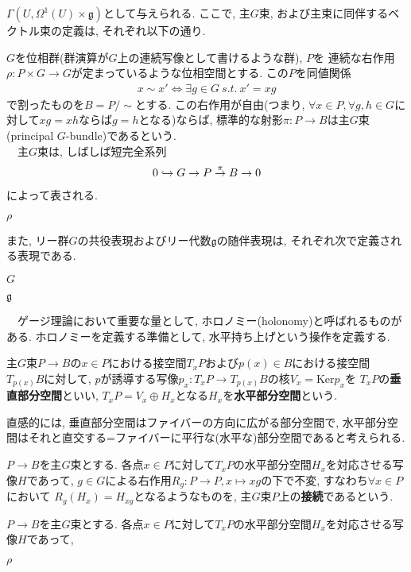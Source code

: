 $\Gamma(U, \Omega^1(U)\times \mathfrak{g})$として与えられる. 
ここで, 主$G$束, および主束に同伴するベクトル束の定義は, それぞれ以下の通り. 
\begin{definition}[主$G$束]
    $G$を位相群(群演算が$G$上の連続写像として書けるような群), $P$を
    連続な右作用$\rho: P\times G \to G$が定まっているような位相空間とする. 
    この$P$を同値関係
    \begin{align}
        x\sim x' \Leftrightarrow \exists g\in G~s.t. ~ x'=xg
    \end{align}
    で割ったものを$B=P/\sim $とする. 
    この右作用が自由(つまり, $\forall x\in P, 
    \forall g, h\in G$に対して$xg=xh$ならば$g=h$となる)ならば, 
    標準的な射影$\pi: P\to B$は主$G$束(principal $G$-bundle)であるという. \\
    　主$G$束は, しばしば短完全系列
    \begin{align}
        0\hookrightarrow G\to P\stackrel{\pi}{\to} B\to 0
    \label{pGbundle}
    \end{align}
    によって表される. 
\end{definition}
\begin{definition}[同伴ベクトル束]
    $\rho$
\end{definition}
また, リー群$G$の共役表現およびリー代数$\mathfrak{g}$の随伴表現は, それぞれ次で定義される表現である. 
\begin{definition}[共役表現]
    $G$
\end{definition}
\begin{definition}[随伴表現]
    $\mathfrak{g}$
\end{definition}
　ゲージ理論において重要な量として, ホロノミー(holonomy)と呼ばれるものがある. 
ホロノミーを定義する準備として, 水平持ち上げという操作を定義する. 
\begin{definition}[水平部分空間]
    主$G$束$P\to B$の$x\in P$における接空間$T_xP$および$p(x)\in B$における接空間$T_{p(x)}B$に対して, 
    $p$が誘導する写像$p_x: T_xP\to T_{p(x)}B$の核$V_x=\mathrm{Ker}p_x$を
    $T_xP$の\textbf{垂直部分空間}といい, $T_x P=V_x\oplus H_x$となる$H_x$を\textbf{水平部分空間}という. 
\end{definition}
直感的には, 垂直部分空間はファイバーの方向に広がる部分空間で, 水平部分空間はそれと直交する=ファイバーに平行な(水平な)部分空間であると考えられる. 
\begin{definition}[主束の接続]
    $P\to B$を主$G$束とする. 
    各点$x\in P$に対して$T_x P$の水平部分空間$H_x$を対応させる写像$H$であって, 
    $g\in G$による右作用$R_g: P\to P, x\mapsto xg$の下で不変, すなわち$\forall x\in P$において
    $R_{g}(H_x)=H_{xg}$となるようなものを, 
    主$G$束$P$上の\textbf{接続}であるという. 
\end{definition}
\begin{definition}[水平持ち上げ]
    $P\to B$を主$G$束とする. 
    各点$x\in P$に対して$T_x P$の水平部分空間$H_x$を対応させる写像$H$であって, 
\end{definition}
\begin{definition}[ホロノミー]
    $\rho$
\end{definition}
